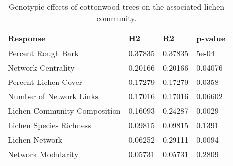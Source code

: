 \begin{table}[ht]
\centering
\begin{tabular}{llll}
  \hline
Response & H2 & R2 & p-value \\ 
  \hline
Percent Rough Bark & 0.37835 & 0.37835 & 5e-04 \\ 
  Network Centrality & 0.20166 & 0.20166 & 0.04076 \\ 
  Percent Lichen Cover & 0.17279 & 0.17279 & 0.0358 \\ 
  Number of Network Links & 0.17016 & 0.17016 & 0.06602 \\ 
  Lichen Community Composition & 0.16093 & 0.24287 & 0.0029 \\ 
  Lichen Species Richness & 0.09815 & 0.09815 & 0.1391 \\ 
  Lichen Network & 0.06252 & 0.29111 & 0.0094 \\ 
  Network Modularity & 0.05731 & 0.05731 & 0.2809 \\ 
   \hline
\end{tabular}
\caption{Genotypic effects of cottonwood trees on the associated lichen community.} 
\label{tab:h2_table}
\end{table}
